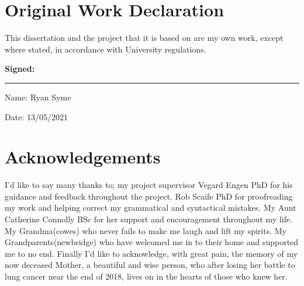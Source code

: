 \chapter*{Original Work Declaration}
\thispagestyle{fancy} %


This dissertation and the project that it is based on are my own work, except where stated, in accordance with University regulations.

\vspace{12pt}
\textbf{Signed:}
\hrule width 0.7\textwidth
\vspace{12pt}

Name: Ryan Syme
\vspace{3pt}

Date: 13/05/2021



\chapter*{Acknowledgements}
\thispagestyle{fancy} %
  I'd like to say many thanks to; my project supervisor Vegard Engen PhD for his guidance and feedback throughout the project. Rob Scaife PhD for proofreading my work and helping correct my grammatical and syntactical mistakes. My Aunt Catherine Connolly BSc for her support and encouragement throughout my life. My Grandma(cowes) who never fails to make me laugh and lift my spirits. My Grandparents(newbridge) who have welcomed me in to their home and supported me to no end. Finally I'd like to acknowledge, with great pain, the memory of my now deceased Mother, a beautiful and wise person, who after losing her battle to lung cancer near the end of 2018, lives on in the hearts of those who knew her.
